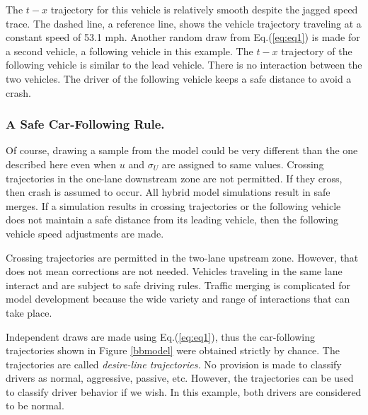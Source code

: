 \documentclass[Proceedings]{ascelike}
\begin{document}
The $t-x$ trajectory for this vehicle is relatively smooth despite the jagged  speed trace. The dashed line, a reference line, shows the vehicle trajectory  traveling at a constant speed of 53.1 mph. Another random draw from Eq.(\ref{eq:eq1}) is made for a second vehicle,  a following vehicle in this example. The $t-x$ trajectory of the following vehicle is similar to the lead vehicle. There is no interaction between the two vehicles. The driver of the following vehicle keeps a safe distance  to avoid a crash. 

\subsubsection{A Safe Car-Following Rule.} 

Of course, drawing a sample from the model could  be very different than the one described here even when $u$ and  $\sigma_U$  are assigned to same values. Crossing trajectories in the one-lane  downstream zone are not permitted. If they cross, then crash is assumed to occur. All hybrid model simulations result in safe merges. If a simulation results in crossing trajectories or the following vehicle does not maintain a safe distance from its leading vehicle, then the following vehicle speed adjustments are made. 

Crossing trajectories are permitted in the two-lane upstream zone. However, that does not mean corrections are not needed.  Vehicles traveling in the same lane interact and are subject to safe driving rules. Traffic merging is complicated for model development because the wide variety and range of interactions that can take place.

Independent draws are made using Eq.(\ref{eq:eq1}), thus the car-following trajectories shown in Figure \ref{bbmodel} were obtained strictly by chance. The trajectories are called \emph{desire-line trajectories.} No provision is made to classify drivers as normal, aggressive, passive,  etc. However, the trajectories can be used to classify driver behavior if we wish. In this example, both  drivers are considered  to be normal.
\end{document}
